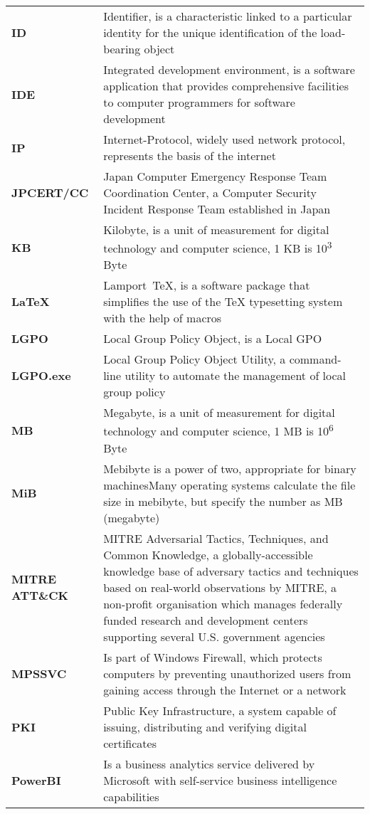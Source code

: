 \begin{longtable}{ p{4cm}  p{12cm} }
    \textbf{ID} & Identifier, is a characteristic linked to a particular identity for the unique identification of the load-bearing object\\
    \textbf{IDE} & Integrated development environment, is a software application that provides comprehensive facilities to computer programmers for software development\\
    \textbf{IP} & Internet-Protocol, widely used network protocol, represents the basis of the internet\\
    \textbf{JPCERT/CC} & Japan Computer Emergency Response Team Coordination Center, a Computer Security Incident Response Team established in Japan\\
    \textbf{KB} & Kilobyte,  is a unit of measurement for digital technology and computer science, 1 KB is 10\textsuperscript{3} Byte\\
    \textbf{LaTeX} & Lamport TeX, is a software package that simplifies the use of the TeX typesetting system with the help of macros\\
    \textbf{LGPO} & Local Group Policy Object, is a Local GPO\\
    \textbf{LGPO.exe} & Local Group Policy Object Utility, a command-line utility to automate the management of local group policy\\
    \textbf{MB} & Megabyte,  is a unit of measurement for digital technology and computer science, 1 MB is 10\textsuperscript{6} Byte\\
    \textbf{MiB} & Mebibyte is a power of two, appropriate for binary machinesMany operating systems calculate the file size in mebibyte, but specify the number as MB (megabyte)\\
    \textbf{MITRE ATT\&CK} & MITRE Adversarial Tactics, Techniques, and Common Knowledge, a globally-accessible knowledge base of adversary tactics and techniques based on real-world observations by MITRE, a non-profit organisation which manages federally funded research and development centers supporting several U.S. government agencies\\
    \textbf{MPSSVC} & Is part of Windows Firewall, which protects computers by preventing unauthorized users from gaining access through the Internet or a network\\
    \textbf{PKI} & Public Key Infrastructure,  a system capable of issuing, distributing and verifying digital certificates\\
    \textbf{PowerBI} & Is a business analytics service delivered by Microsoft with self-service business intelligence capabilities\\

\end{longtable}
